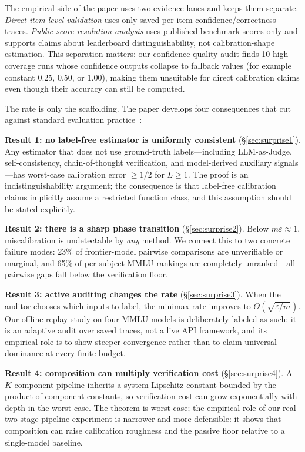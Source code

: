 \documentclass{article}
\newcommand{\Lip}{L}
\newcommand{\errrate}{\varepsilon}
\newcommand{\nsamples}{m}
\theoremstyle{definition}
\begin{document}
The empirical side of the paper uses two evidence lanes and keeps them separate. \emph{Direct item-level validation} uses only saved per-item confidence/correctness traces. \emph{Public-score resolution analysis} uses published benchmark scores only and supports claims about leaderboard distinguishability, not calibration-shape estimation. This separation matters: our confidence-quality audit finds 10 high-coverage runs whose confidence outputs collapse to fallback values (for example constant 0.25, 0.50, or 1.00), making them unsuitable for direct calibration claims even though their accuracy can still be computed.

The rate is only the scaffolding. The paper develops four consequences that cut against standard evaluation practice~\citep{liang2023helm,zheng2023judging,chiang2024chatbot}:

\textbf{Result 1: no label-free estimator is uniformly consistent} (\S\ref{sec:surprise1}). Any estimator that does not use ground-truth labels---including LLM-as-Judge, self-consistency, chain-of-thought verification, and model-derived auxiliary signals---has worst-case calibration error $\geq 1/2$ for $\Lip \geq 1$. The proof is an indistinguishability argument; the consequence is that label-free calibration claims implicitly assume a restricted function class, and this assumption should be stated explicitly.

\textbf{Result 2: there is a sharp phase transition} (\S\ref{sec:surprise2}). Below $\nsamples \errrate \approx 1$, miscalibration is undetectable by \emph{any} method. We connect this to two concrete failure modes: 23\% of frontier-model pairwise comparisons are unverifiable or marginal, and 65\% of per-subject MMLU rankings are completely unranked---all pairwise gaps fall below the verification floor.

\textbf{Result 3: active auditing changes the rate} (\S\ref{sec:surprise3}). When the auditor chooses which inputs to label, the minimax rate improves to $\Theta(\sqrt{\errrate/\nsamples})$. Our offline replay study on four MMLU models is deliberately labeled as such: it is an adaptive audit over saved traces, not a live API framework, and its empirical role is to show steeper convergence rather than to claim universal dominance at every finite budget.

\textbf{Result 4: composition can multiply verification cost} (\S\ref{sec:surprise4}). A $K$-component pipeline inherits a system Lipschitz constant bounded by the product of component constants, so verification cost can grow exponentially with depth in the worst case. The theorem is worst-case; the empirical role of our real two-stage pipeline experiment is narrower and more defensible: it shows that composition can raise calibration roughness and the passive floor relative to a single-model baseline.
\end{document}
